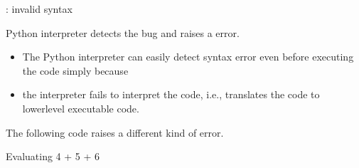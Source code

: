 \documentclass[letterpaper,10pt,english]{sphinxmanual}
\begin{document}
\begin{sphinxVerbatim}[commandchars=\\\{\}]
  
: invalid syntax
\end{sphinxVerbatim}

Python interpreter detects the bug and raises a  error.

\begin{itemize}
\item {} 
The Python interpreter can easily detect syntax error even before executing the code simply because

\item {} 
the interpreter fails to interpret the code, i.e., translates the code to lower\sphinxhyphen{}level executable code.

\end{itemize}

The following code raises a different kind of error.

\begin{sphinxVerbatim}[commandchars=\\\{\}]
      
\end{sphinxVerbatim}

\begin{sphinxVerbatim}[commandchars=\\\{\}]
Evaluating \PYGZsq{}4\PYGZsq{} + \PYGZsq{}5\PYGZsq{} + 6
\end{sphinxVerbatim}
\end{document}
